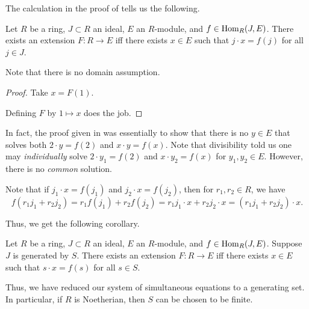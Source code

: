 The calculation in the proof of  tells us the following.

\begin{prop} \label{prop:simultaneous-solution-extend-to-R}
	Let $R$ be a ring, $J \subset R$ an ideal, $E$ an $R$-module, and $f \in \operatorname{Hom}_{R}(J, E)$. \newline
	There exists an extension $F : R \to E$ iff there exists $x \in E$ such that $j \cdot x = f(j)$ for all $j \in J$. 
\end{prop}
Note that there is no domain assumption.
\begin{proof} 
	\forward Take $x = F(1)$. 

	\backward Defining $F$ by $1 \mapsto x$ does the job.
\end{proof}

In fact, the proof given in  was essentially to show that there is no $y \in E$ that solves both $2 \cdot y = f(2)$ and $x \cdot y = f(x)$. Note that divisibility told us one may \emph{individually} solve $2 \cdot y_{1} = f(2)$ and $x \cdot y_{2} = f(x)$ for $y_{1}, y_{2} \in E$. However, there is no \emph{common} solution.

Note that if $j_{1} \cdot x = f(j_{1})$ and $j_{2} \cdot x = f(j_{2})$, then for $r_{1}, r_{2} \in R$, we have
\begin{equation*} 
	f(r_{1} j_{1} + r_{2} j_{2}) = r_{1} f(j_{1}) + r_{2} f(j_{2}) = r_{1} j_{1} \cdot x + r_{2} j_{2} \cdot x = (r_{1} j_{1} + r_{2} j_{2}) \cdot x.
\end{equation*}

Thus, we get the following corollary.

\begin{cor} \label{cor:simultaneous-solution-extend-to-R}
	Let $R$ be a ring, $J \subset R$ an ideal, $E$ an $R$-module, and $f \in \operatorname{Hom}_{R}(J, E)$. Suppose $J$ is generated by $S$. \newline
	There exists an extension $F : R \to E$ iff there exists $x \in E$ such that $s \cdot x = f(s)$ for all $s \in S$. 
\end{cor}

Thus, we have reduced our system of simultaneous equations to a generating set. In particular, if $R$ is Noetherian, then $S$ can be chosen to be finite. 

